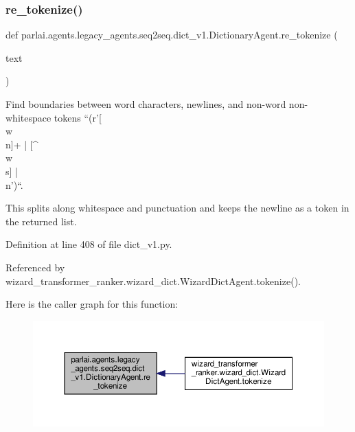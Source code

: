 \subsubsection{\texorpdfstring{re\+\_\+tokenize()}{re\_tokenize()}}
{\footnotesize\ttfamily def parlai.\+agents.\+legacy\+\_\+agents.\+seq2seq.\+dict\+\_\+v1.\+Dictionary\+Agent.\+re\+\_\+tokenize (\begin{DoxyParamCaption}\item[{}]{text }\end{DoxyParamCaption})\hspace{0.3cm}{\ttfamily [static]}}

\begin{DoxyVerb}Find boundaries between word characters, newlines, and non-word
non-whitespace tokens ``(r'[\\w\\n]+ | [^\\w\\s] | \\n')``.

This splits along whitespace and punctuation and keeps the newline as
a token in the returned list.
\end{DoxyVerb}
 

Definition at line 408 of file dict\+\_\+v1.\+py.



Referenced by wizard\+\_\+transformer\+\_\+ranker.\+wizard\+\_\+dict.\+Wizard\+Dict\+Agent.\+tokenize().

Here is the caller graph for this function\+:
\nopagebreak
\begin{figure}[H]
\begin{center}
\leavevmode
\includegraphics[width=350pt]{classparlai_1_1agents_1_1legacy__agents_1_1seq2seq_1_1dict__v1_1_1DictionaryAgent_abff9231bccd54f5222bef672dd978516_icgraph}
\end{center}
\end{figure}
\mbox{\label{classparlai_1_1agents_1_1legacy__agents_1_1seq2seq_1_1dict__v1_1_1DictionaryAgent_a77b3d40dd63f7ab22bfc947b343339c7}} 
